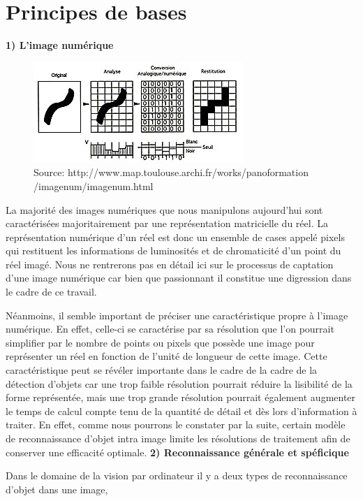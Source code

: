 \documentclass[a4paper,12pt]{article} %
\begin{document}
\section{Principes de bases}
\textbf{1) L'image numérique }\newline
\begin{figure}[h] %
  \centering %
  \includegraphics[scale=0.8]{binaire.jpg} %
  \caption{Source: http://www.map.toulouse.archi.fr/works/panoformation
  /imagenum/imagenum.html } %
\end{figure}
\newline
\par
	La majorité des images numériques que nous manipulons aujourd’hui sont caractérisées majoritairement par une représentation matricielle du réel. La représentation numérique d’un réel est donc un ensemble de cases appelé pixels qui restituent les informations de luminosités et de chromaticité d’un point du réel imagé. Nous ne rentrerons pas en détail ici sur le processus de captation d’une image numérique car bien que passionnant il constitue une digression dans le cadre de ce travail. \newline

	Néanmoins, il semble important de préciser une caractéristique propre à l’image numérique. En effet, celle-ci se caractérise par sa résolution que l’on pourrait simplifier par le nombre de points ou pixels que possède une image pour représenter un réel en fonction de l’unité de longueur de cette image. Cette caractéristique peut se révéler importante dans le cadre de la cadre de la détection d’objets car une trop faible résolution pourrait réduire la lisibilité de la forme représentée, mais une trop grande résolution pourrait également augmenter le temps de calcul compte tenu de la quantité de détail et dès lors d’information à traiter. En effet, comme nous pourrons le constater par la suite, certain modèle de reconnaissance d’objet intra image limite les résolutions de traitement afin de conserver une efficacité optimale.  
\newpage
\textbf{2) Reconnaissance générale et spéficique}
\newline
\par
	Dans le domaine de la vision par ordinateur il y a deux types de reconnaissance d'objet dans une image, 
\newpage
\end{document}
